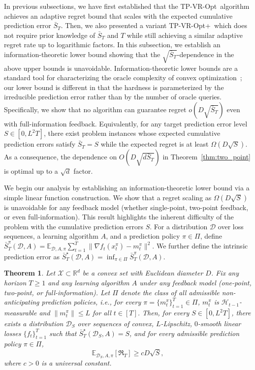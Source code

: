 \documentclass[journal,onecolumn]{IEEEtran}
\theoremstyle{plain}
\newtheorem{theorem}{Theorem}[section]
\theoremstyle{definition}
\theoremstyle{remark}
\newcommand{\regret}{\mathfrak{R}}
\newcommand{\tpvr}{{\sc TP-VR-Opt}}
\newcommand{\tpvrplus}{{\sc TP-VR-Opt+}}
\begin{document}
In previous subsections, we have first established that the \tpvr\, algorithm
achieves an adaptive regret bound that scales with the expected cumulative prediction error
$\bar S_{T}$. Then, we also presented a variant \tpvrplus\, which does not require
prior knowledge of $\bar S_{T}$ and $T$ while still achieving a similar adaptive
regret rate up to logarithmic factors. In this subsection, we establish an information-theoretic lower bound showing
that the $\sqrt{\bar S_T}$-dependence in the above upper bounds is unavoidable. Information-theoretic lower bounds are a standard tool for characterizing
the oracle complexity of convex optimization~\cite{agarwal2012information};
our lower bound is different in that the hardness is parameterized by the
irreducible prediction error rather than by the number of oracle queries. Specifically, we show
that no algorithm can guarantee regret $o(D\sqrt{\bar S_{T}})$ even
with full-information feedback. Equivalently, for any target prediction error
level $S \in [0, L^{2}T]$, there exist problem instances whose expected cumulative prediction errors
satisfy $\bar S_{T}= S$ while the expected regret is at least $\Omega(D\sqrt{S})$.
As a consequence, the dependence on $O(D\sqrt{d\bar S_{T}})$ in Theorem~\ref{thm:two_point}
is optimal up to a $\sqrt{d}$ factor.


We begin our analysis by establishing an information-theoretic lower bound via a
simple linear function construction. We show that a regret scaling as   $\Omega(D\sqrt{S})$
is unavoidable for any feedback model (whether single-point, two-point feedback,
or even full-information). This result highlights the inherent difficulty of the
problem with the cumulative prediction errors $S$. For a distribution $\mathcal D$ over loss sequences, a learning algorithm
$A$, and a prediction policy $\pi\in\Pi$, define $\bar S_T^\pi(\mathcal D,A)=
\mathbb E_{\mathcal D,A,\pi}
\sum_{t=1}^T\|\nabla f_t(x_t^\pi)-m_t^\pi\|^2$. We further define the intrinsic prediction error as $\bar S_T^\star(\mathcal D,A)=\inf_{\pi\in\Pi}\bar S_T^\pi(\mathcal D,A)$.


\begin{theorem}
    \label{thm:lb-linear} 
    Let $\mathcal X\subset\mathbb R^d$ be a convex set with Euclidean diameter $D$.
Fix any horizon $T\ge1$ and any learning algorithm $A$ under any feedback model
(one-point, two-point, or full-information). Let $\Pi$ denote the class of all
admissible non-anticipating prediction policies, i.e., for every $\pi =   \{m_t^\pi\}_{t=1}^T\in\Pi$,
$m_t^\pi$ is $\mathcal H_{t-1}$-measurable and $\|m_t^\pi\|\le L$ for all $t\in [T]$. Then, for every $S\in[0,L^2T]$, there exists a distribution $\mathcal D_S$ over
sequences of convex, $L$-Lipschitz, $0$-smooth linear losses
$\{f_t\}_{t=1}^T$ such that $\bar S_T^\star(\mathcal D_S,A)=S$, and for every admissible prediction policy $\pi\in\Pi$,
\begin{equation}
\mathbb E_{\mathcal D_S,A,\pi}[\regret_T]
    \ge
    cD\sqrt S, \label{eqn:lower_bd_S}
\end{equation}
where $c>0$ is a universal constant.
    
\end{theorem}
\end{document}

